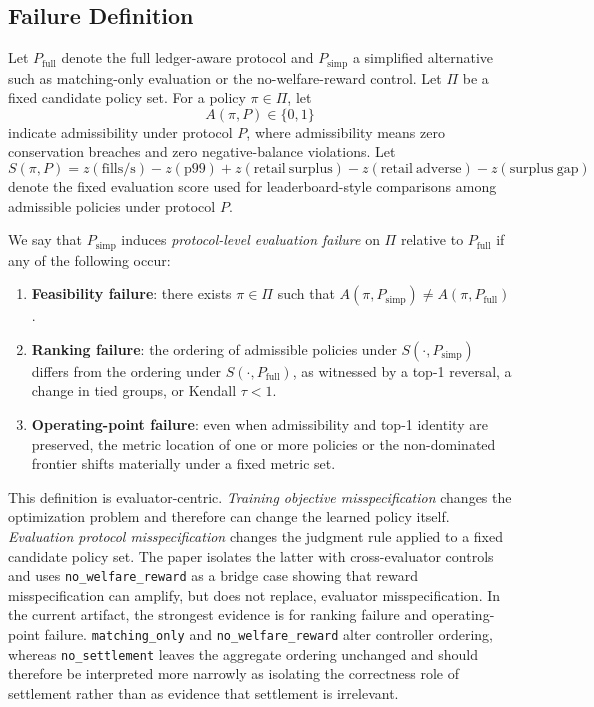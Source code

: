 \documentclass[11pt]{article}
\begin{document}
\subsection{Failure Definition}
Let $P_{\mathrm{full}}$ denote the full ledger-aware protocol and $P_{\mathrm{simp}}$ a simplified alternative such as matching-only evaluation or the no-welfare-reward control. Let $\Pi$ be a fixed candidate policy set. For a policy $\pi \in \Pi$, let
\[
A(\pi, P) \in \{0,1\}
\]
indicate admissibility under protocol $P$, where admissibility means zero conservation breaches and zero negative-balance violations. Let
\[
S(\pi, P) = z(\mathrm{fills/s}) - z(\mathrm{p99}) + z(\mathrm{retail\ surplus}) - z(\mathrm{retail\ adverse}) - z(\mathrm{surplus\ gap})
\]
denote the fixed evaluation score used for leaderboard-style comparisons among admissible policies under protocol $P$.

We say that $P_{\mathrm{simp}}$ induces \emph{protocol-level evaluation failure} on $\Pi$ relative to $P_{\mathrm{full}}$ if any of the following occur:
\begin{enumerate}[leftmargin=*]
  \item \textbf{Feasibility failure}: there exists $\pi \in \Pi$ such that $A(\pi, P_{\mathrm{simp}}) \neq A(\pi, P_{\mathrm{full}})$.
  \item \textbf{Ranking failure}: the ordering of admissible policies under $S(\cdot, P_{\mathrm{simp}})$ differs from the ordering under $S(\cdot, P_{\mathrm{full}})$, as witnessed by a top-1 reversal, a change in tied groups, or Kendall $\tau < 1$.
  \item \textbf{Operating-point failure}: even when admissibility and top-1 identity are preserved, the metric location of one or more policies or the non-dominated frontier shifts materially under a fixed metric set.
\end{enumerate}

This definition is evaluator-centric. \emph{Training objective misspecification} changes the optimization problem and therefore can change the learned policy itself. \emph{Evaluation protocol misspecification} changes the judgment rule applied to a fixed candidate policy set. The paper isolates the latter with cross-evaluator controls and uses \texttt{no\_welfare\_reward} as a bridge case showing that reward misspecification can amplify, but does not replace, evaluator misspecification. In the current artifact, the strongest evidence is for ranking failure and operating-point failure. \texttt{matching\_only} and \texttt{no\_welfare\_reward} alter controller ordering, whereas \texttt{no\_settlement} leaves the aggregate ordering unchanged and should therefore be interpreted more narrowly as isolating the correctness role of settlement rather than as evidence that settlement is irrelevant.
\end{document}
